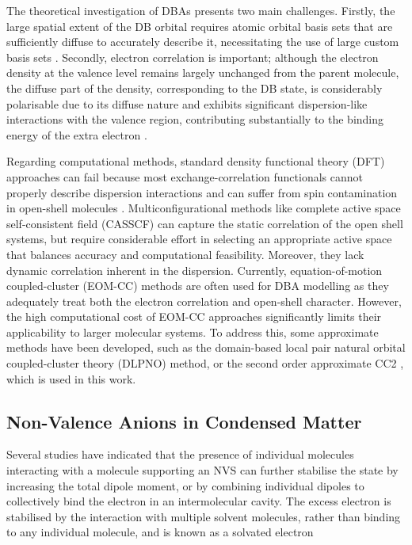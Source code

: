 The theoretical investigation of DBAs presents two main challenges. Firstly, the large spatial extent of the DB orbital requires atomic orbital basis sets that are sufficiently diffuse to accurately describe it, necessitating the use of large custom basis sets \cite{skurski2000choose}. Secondly, electron correlation is important; although the electron density at the valence level remains largely unchanged from the parent molecule, the diffuse part of the density, corresponding to the DB state, is considerably polarisable due to its diffuse nature and exhibits significant dispersion-like interactions with the valence region, contributing substantially to the binding energy of the extra electron \cite{simons2008molecular,simons2011theoretical,simons2023molecular,gutowski1996contribution,voora2017theoretical}.

Regarding computational methods, standard density functional theory (DFT) approaches can fail because most exchange-correlation functionals cannot properly describe dispersion interactions and can suffer from spin contamination in open-shell molecules \cite{thiam2023accurately}. Multiconfigurational methods like complete active space self-consistent field (CASSCF)\cite{vila2002theoretical,ivanov2015anion} can capture the static correlation of the open shell systems, but require considerable effort in selecting an appropriate active space that balances accuracy and computational feasibility. Moreover, they lack dynamic correlation inherent in the dispersion. Currently, equation-of-motion coupled-cluster (EOM-CC)\cite{herbert2015quantum,jordan2003theory,moorby2024signatures} methods are often used for DBA modelling as they adequately treat both the electron correlation and open-shell character. However, the high computational cost of EOM-CC approaches significantly limits their applicability to larger molecular systems. To address this, some approximate methods have been developed, such as the domain-based local pair natural orbital coupled-cluster theory (DLPNO) method\cite{haldar2020multilayer,schulz2018systematic}, or the second order approximate CC2 \cite{christiansen1995second,paran2024performance}, which is used in this work.

\subsection{Non-Valence Anions in Condensed Matter}

Several studies have indicated that the presence of individual molecules interacting with a molecule supporting an NVS can further stabilise the state by increasing the total dipole moment, or by combining individual dipoles to collectively bind the electron in an intermolecular cavity. The excess electron is stabilised by the interaction with multiple solvent molecules, rather than binding to any individual molecule, and is known as a solvated electron \cite{schiedt1998anion,gutowski2002solvated,jordan2003theory,eustis2007photoelectron,simons2008molecular,herbert2015quantum,clarke2025role}

